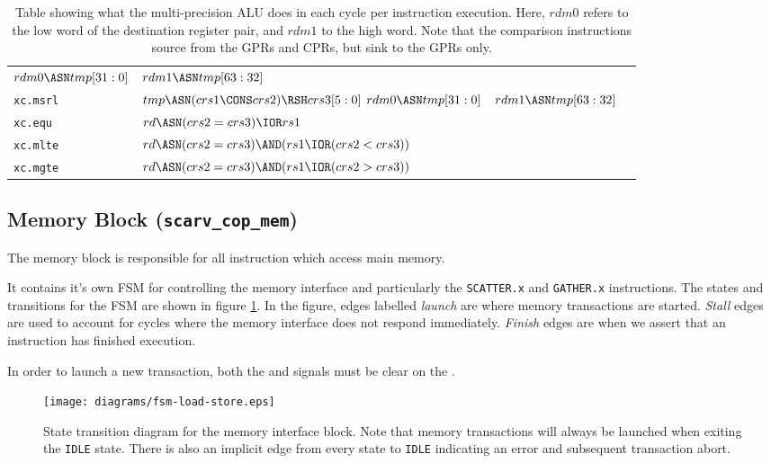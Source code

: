 \documentclass{article}
\begin{document}
\begin{table}[H]
\begin{tabularx}{\textwidth}{l Y Y Y }
    $rdm0\ASN tmp[31:0]$ 
 &  $rdm1\ASN tmp[63:32]$ 
 &
\\
{\tt xc.msrl }&
    $tmp \ASN (crs1 \CONS crs2) \RSH crs3[5:0]$\newline 
    $rdm0\ASN tmp[31:0]$ 
 &  $rdm1\ASN tmp[63:32]$ 
 &
\\
{\tt xc.equ }&
    $ rd \ASN (crs2 = crs3) \IOR rs1 $
 &
 &
\\
{\tt xc.mlte }&
    $rd \ASN (crs2 = crs3) \AND (rs1 \IOR (crs2 < crs3)) $
 &
 &
\\
{\tt xc.mgte }&
    $rd \ASN (crs2 = crs3) \AND (rs1 \IOR (crs2 > crs3)) $
 &
 &
\\
\bottomrule
\end{tabularx}
\caption{Table showing what the multi-precision ALU does in each cycle
per instruction execution. Here, $rdm0$ refers to the low word of the
destination register pair, and $rdm1$ to the high word. Note that the
comparison instructions source from the GPRs and CPRs, but sink to the
GPRs only.}
\label{tab:mp-alu-exec}
\end{table}

\subsection{Memory Block ({\tt scarv\_cop\_mem})}

The memory block is responsible for all instruction which access main
memory.

It contains it's own FSM for controlling the memory interface
and particularly the {\tt SCATTER.x} and {\tt GATHER.x} instructions.
The states and transitions for the FSM are shown in figure 
\ref{fig:mem-block-fsm}. 
In the figure, edges labelled {\em launch} are
where memory transactions are started.
{\em Stall} edges are used to
account for cycles where the memory interface does not respond immediately.
{\em Finish} edges are when we assert that an instruction has finished
execution.

In order to launch a new transaction, both the 
and  signals must be clear on the
.

\begin{figure}
\centering
\texttt{[image: diagrams/fsm-load-store.eps]}
\caption{State transition diagram for the memory interface block.
Note that memory transactions will always be launched when exiting the
{\tt IDLE} state. There is also an implicit edge from every state to
{\tt IDLE} indicating an error and subsequent transaction abort.}
\label{fig:mem-block-fsm}
\end{figure}
\end{document}
